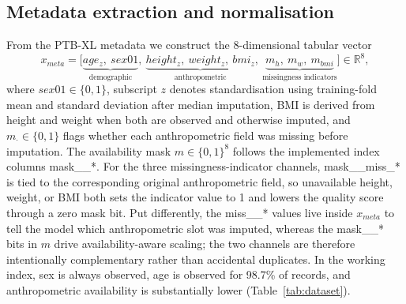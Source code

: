 \documentclass[mathematics,article,submit,pdftex]{Definitions/mdpi}
\def\texttt#1{#1}%
\def\mathrm#1{#1}%
\def\mathbf#1{#1}%
\begin{document}
\subsection{Metadata extraction and normalisation}
From the PTB-XL metadata we construct the 8-dimensional tabular vector
\begin{equation}\label{eq:xmeta}
\mathbf{x}_{\mathrm{meta}}
= \bigl[\underbrace{\mathrm{age}_z,\ \mathrm{sex01}}_{\text{demographic}},\ 
         \underbrace{\mathrm{height}_z,\ \mathrm{weight}_z,\ \mathrm{bmi}_z}_{\text{anthropometric}},\ 
         \underbrace{m_h,\ m_w,\ m_{\mathrm{bmi}}}_{\text{missingness indicators}}\bigr]
\in \mathbb{R}^{8},
\end{equation}
where $\mathrm{sex01}\in\{0,1\}$, subscript $z$ denotes standardisation using training-fold mean and standard deviation after median imputation, BMI is derived from height and weight when both are observed and otherwise imputed, and $m_{\cdot}\in\{0,1\}$ flags whether each anthropometric field was missing before imputation. The availability mask $\mathbf{m}\in\{0,1\}^{8}$ follows the implemented index columns \texttt{mask\_\_*}. For the three missingness-indicator channels, \texttt{mask\_\_miss\_*} is tied to the corresponding original anthropometric field, so unavailable height, weight, or BMI both sets the indicator value to 1 and lowers the quality score through a zero mask bit. Put differently, the \texttt{miss\_\_*} values live inside $\mathbf{x}_{\mathrm{meta}}$ to tell the model which anthropometric slot was imputed, whereas the \texttt{mask\_\_*} bits in $\mathbf{m}$ drive availability-aware scaling; the two channels are therefore intentionally complementary rather than accidental duplicates. In the working index, sex is always observed, age is observed for 98.7\% of records, and anthropometric availability is substantially lower (Table~\ref{tab:dataset}).
\end{document}
